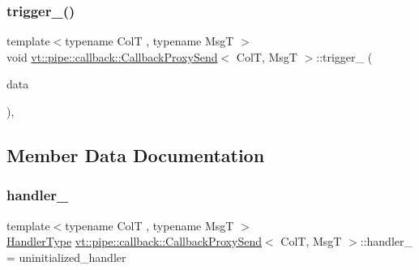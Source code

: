 \mbox{\label{structvt_1_1pipe_1_1callback_1_1_callback_proxy_send_ab961a5a59f7597cefb69603b1d31f6b1}} 
\subsubsection{\texorpdfstring{trigger\+\_\+()}{trigger\_()}}
{\footnotesize\ttfamily template$<$typename ColT , typename MsgT $>$ \\
void \hyperlink{structvt_1_1pipe_1_1callback_1_1_callback_proxy_send}{vt\+::pipe\+::callback\+::\+Callback\+Proxy\+Send}$<$ ColT, MsgT $>$\+::trigger\+\_\+ (\begin{DoxyParamCaption}\item[{\hyperlink{structvt_1_1pipe_1_1callback_1_1_callback_proxy_send_a2a8b17dedeb5cc2b68ca5c7386796ef3}{Signal\+Data\+Type} $\ast$}]{data }\end{DoxyParamCaption})\hspace{0.3cm}{\ttfamily [override]}, {\ttfamily [private]}}



\subsection{Member Data Documentation}
\mbox{\label{structvt_1_1pipe_1_1callback_1_1_callback_proxy_send_a913ed1823ba404d9f6675e8ef08bdca1}} 
\subsubsection{\texorpdfstring{handler\+\_\+}{handler\_}}
{\footnotesize\ttfamily template$<$typename ColT , typename MsgT $>$ \\
\hyperlink{namespacevt_af64846b57dfcaf104da3ef6967917573}{Handler\+Type} \hyperlink{structvt_1_1pipe_1_1callback_1_1_callback_proxy_send}{vt\+::pipe\+::callback\+::\+Callback\+Proxy\+Send}$<$ ColT, MsgT $>$\+::handler\+\_\+ = uninitialized\+\_\+handler\hspace{0.3cm}{\ttfamily [private]}}

